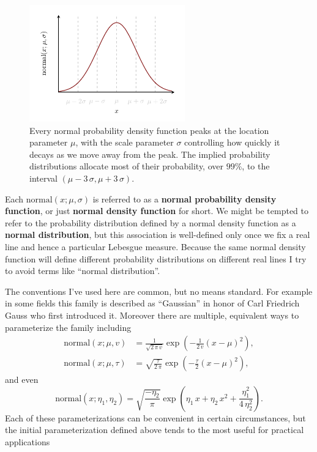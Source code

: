 \documentclass[
  letterpaper,
  DIV=11,
  numbers=noendperiod]{scrartcl}
\begin{document}
\begin{figure}

{\centering \includegraphics[width=0.6\textwidth,height=\textheight]{figures/normal/density/density.pdf}

}

\caption{\label{fig-normal-density}Every normal probability density
function peaks at the location parameter \(\mu\), with the scale
parameter \(\sigma\) controlling how quickly it decays as we move away
from the peak. The implied probability distributions allocate most of
their probability, over \(99\%\), to the interval
\((\mu - 3 \, \sigma, \mu + 3 \, \sigma)\).}

\end{figure}

Each \(\mathrm{normal}(x; \mu, \sigma)\) is referred to as a
\textbf{normal probability density function}, or just \textbf{normal
density function} for short. We might be tempted to refer to the
probability distribution defined by a normal density function as a
\textbf{normal distribution}, but this association is well-defined only
once we fix a real line and hence a particular Lebesgue measure. Because
the same normal density function will define different probability
distributions on different real lines I try to avoid terms like ``normal
distribution''.

The conventions I've used here are common, but no means standard. For
example in some fields this family is described as ``Gaussian'' in honor
of Carl Friedrich Gauss who first introduced it. Moreover there are
multiple, equivalent ways to parameterize the family including
\begin{align*}
\mathrm{normal}(x; \mu, v)
&=
\frac{1}{\sqrt{2 \, \pi \, v}}
\exp \left( -\frac{1}{2 \, v} \left( x - \mu \right)^{2} \right),
\\
\mathrm{normal}(x; \mu, \tau)
&=
\sqrt{ \frac{\tau}{2 \, \pi} }
\exp \left( -\frac{\tau}{2} \left( x - \mu \right)^{2} \right),
\end{align*} and even \[
\mathrm{normal}(x; \eta_{1}, \eta_{2})
=
\sqrt{ \frac{-\eta_{2}}{\pi} }
\exp \left(  \eta_{1} \, x + \eta_{2} \, x^{2}
           + \frac{\eta_{1}^{2}}{4 \, \eta_{2}^{2}} \right).
\] Each of these parameterizations can be convenient in certain
circumstances, but the initial parameterization defined above tends to
the most useful for practical applications
\end{document}
